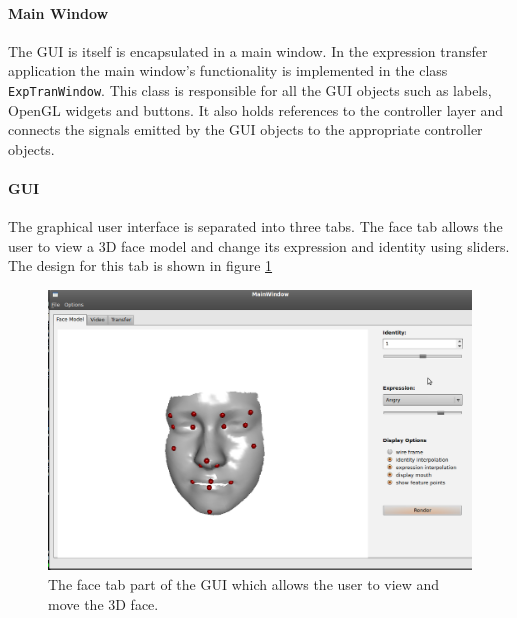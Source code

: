 \documentclass[11pt,a4paper,twoside]{report}
\begin{document}
\paragraph{Main Window}
The GUI is itself is encapsulated in a main window. In the expression transfer application the
main window's functionality is implemented in the class
\texttt{ExpTranWindow}. This class is responsible for all the GUI objects such
as labels, OpenGL widgets and buttons. It also holds references to the controller
layer and connects the signals emitted by the GUI objects to the appropriate
controller objects.
\paragraph{GUI}
The graphical user interface is separated into three tabs. The face tab allows
the user to view a 3D face model and change its expression and identity using
sliders. The design for this tab is shown in figure \ref{fg:facetab}

\begin{figure}[h]
\begin{centering}
\includegraphics[scale=0.35]{images/facetab.png}
\par\end{centering}

\caption{The face tab part of the GUI which allows the user to view and move the
  3D face.}
\label{fg:facetab}
\end{figure}
\end{document}
